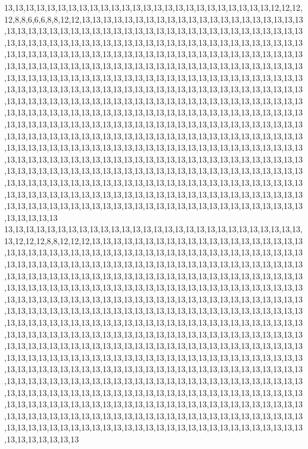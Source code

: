 13,13,13,13,13,13,13,13,13,13,13,13,13,13,13,13,13,13,13,13,13,13,13,13,13,12,12,12,12,8,8,6,6,6,8,8,12,12,13,13,13,13,13,13,13,13,13,13,13,13,13,13,13,13,13,13,13,13,13,13,13,13,13,13,13,13,13,13,13,13,13,13,13,13,13,13,13,13,13,13,13,13,13,13,13,13,13,13,13,13,13,13,13,13,13,13,13,13,13,13,13,13,13,13,13,13,13,13,13,13,13,13,13,13,13,13,13,13,13,13,13,13,13,13,13,13,13,13,13,13,13,13,13,13,13,13,13,13,13,13,13,13,13,13,13,13,13,13,13,13,13,13,13,13,13,13,13,13,13,13,13,13,13,13,13,13,13,13,13,13,13,13,13,13,13,13,13,13,13,13,13,13,13,13,13,13,13,13,13,13,13,13,13,13,13,13,13,13,13,13,13,13,13,13,13,13,13,13,13,13,13,13,13,13,13,13,13,13,13,13,13,13,13,13,13,13,13,13,13,13,13,13,13,13,13,13,13,13,13,13,13,13,13,13,13,13,13,13,13,13,13,13,13,13,13,13,13,13,13,13,13,13,13,13,13,13,13,13,13,13,13,13,13,13,13,13,13,13,13,13,13,13,13,13,13,13,13,13,13,13,13,13,13,13,13,13,13,13,13,13,13,13,13,13,13,13,13,13,13,13,13,13,13,13,13,13,13,13,13,13,13,13,13,13,13,13,13,13,13,13,13,13,13,13,13,13,13,13,13,13,13,13,13,13,13,13,13,13,13,13,13,13,13,13,13,13,13,13,13,13,13,13,13,13,13,13,13,13,13,13,13,13,13,13,13,13,13,13,13,13,13,13,13,13,13,13,13,13,13,13,13,13,13,13,13,13,13,13,13,13,13,13,13,13,13,13,13,13,13,13,13,13,13,13,13,13,13,13,13,13,13,13,13,13,13,13,13,13,13,13,13,13,13,13,13,13,13,13,13,13,13,13,13,13,13,13,13,13,13,13,13,13,13,13,13,13,13,13,13,13,13,13,13,13,13,13,13,13,13,13,13,13,13,13,13,13,13,13,13,13,13,13,13,13,13,13,13,13,13,13,13,13,13,13,13,13,13,13,13,13,13,13,13,13,13,13,13,13,13,13,13,13
13,13,13,13,13,13,13,13,13,13,13,13,13,13,13,13,13,13,13,13,13,13,13,13,13,13,13,13,13,12,12,12,8,8,12,12,12,13,13,13,13,13,13,13,13,13,13,13,13,13,13,13,13,13,13,13,13,13,13,13,13,13,13,13,13,13,13,13,13,13,13,13,13,13,13,13,13,13,13,13,13,13,13,13,13,13,13,13,13,13,13,13,13,13,13,13,13,13,13,13,13,13,13,13,13,13,13,13,13,13,13,13,13,13,13,13,13,13,13,13,13,13,13,13,13,13,13,13,13,13,13,13,13,13,13,13,13,13,13,13,13,13,13,13,13,13,13,13,13,13,13,13,13,13,13,13,13,13,13,13,13,13,13,13,13,13,13,13,13,13,13,13,13,13,13,13,13,13,13,13,13,13,13,13,13,13,13,13,13,13,13,13,13,13,13,13,13,13,13,13,13,13,13,13,13,13,13,13,13,13,13,13,13,13,13,13,13,13,13,13,13,13,13,13,13,13,13,13,13,13,13,13,13,13,13,13,13,13,13,13,13,13,13,13,13,13,13,13,13,13,13,13,13,13,13,13,13,13,13,13,13,13,13,13,13,13,13,13,13,13,13,13,13,13,13,13,13,13,13,13,13,13,13,13,13,13,13,13,13,13,13,13,13,13,13,13,13,13,13,13,13,13,13,13,13,13,13,13,13,13,13,13,13,13,13,13,13,13,13,13,13,13,13,13,13,13,13,13,13,13,13,13,13,13,13,13,13,13,13,13,13,13,13,13,13,13,13,13,13,13,13,13,13,13,13,13,13,13,13,13,13,13,13,13,13,13,13,13,13,13,13,13,13,13,13,13,13,13,13,13,13,13,13,13,13,13,13,13,13,13,13,13,13,13,13,13,13,13,13,13,13,13,13,13,13,13,13,13,13,13,13,13,13,13,13,13,13,13,13,13,13,13,13,13,13,13,13,13,13,13,13,13,13,13,13,13,13,13,13,13,13,13,13,13,13,13,13,13,13,13,13,13,13,13,13,13,13,13,13,13,13,13,13,13,13,13,13,13,13,13,13,13,13,13,13,13,13,13,13,13,13,13,13,13,13,13,13,13,13,13,13,13,13,13,13,13,13,13,13,13,13,13,13,13,13,13,13,13,13,13,13,13
